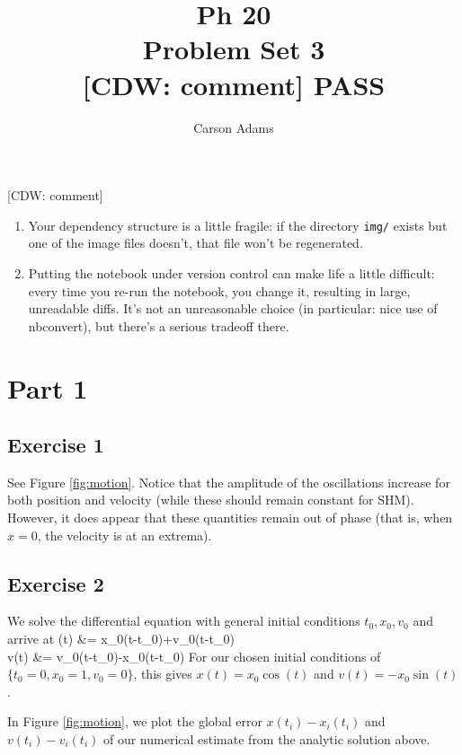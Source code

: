 \documentclass{article}
\def\bal#1\eal{\begin{align}#1\end{align}}
\newcommand{\cdw}[1]
           {{\color{blue} [CDW: comment] #1}}
\theoremstyle{definition}
\begin{document}
      \title{Ph 20
        \\Problem Set 3
      \\ \cdw{PASS}}
      \author{Carson Adams}
      \date{}
      \maketitle

\cdw{
  \begin{enumerate}
  \item Your dependency structure is a little fragile: if the directory \texttt{img/} exists but one of the image files doesn't, that file won't be regenerated.
  \item Putting the notebook under version control can make life a little difficult: every time you re-run the notebook, you change it, resulting in large, unreadable diffs. It's not an unreasonable choice (in particular: nice use of nbconvert), but there's a serious tradeoff there.
  \end{enumerate}
}
\section*{Part 1}      
\subsection*{Exercise 1}
See Figure \ref{fig:motion}. Notice that the amplitude of the oscillations increase for both position and velocity (while these should remain constant for SHM). However, it does appear that these quantities remain out of phase (that is, when $x=0$, the velocity is at an extrema). 

\subsection*{Exercise 2}
We solve the differential equation with general initial conditions $t_0, x_0, v_0$ and arrive at 
\bal
x(t) &= x_0\cos(t-t_0)+v_0\sin(t-t_0)\\
v(t) &= v_0\cos(t-t_0)-x_0\sin(t-t_0)
\eal
For our chosen initial conditions of $\{t_0=0,x_0 = 1, v_0=0\}$, this gives $x(t) = x_0\cos(t)$ and $v(t) = -x_0\sin(t)$. 
\par In Figure \ref{fig:motion}, we plot the global error $x(t_i)-x_i(t_i)$ and $v(t_i)-v_i(t_i)$ of our numerical estimate from the analytic solution above. 
\end{document}
